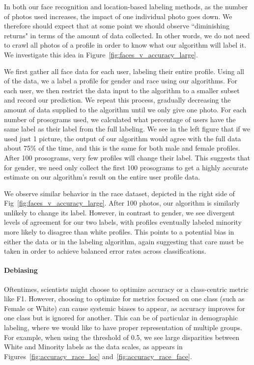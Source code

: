 In both our face recognition and location-based labeling methods, as the number of photos used increases, the impact of one individual photo goes down.
We therefore should expect that at some point we should observe ``diminishing returns" in terms of the amount of data collected.
In other words, we do not need to crawl all photos of a profile in order to know what our algorithm will label it.
We investigate this idea in Figure~\ref{fig:faces_v_accuracy_large}.

We first gather all face data for each user, labeling their entire profile.
Using all of the data, we a label a profile for gender and race using our algorithms.
For each user, we then restrict the data input to the algorithm to a smaller subset and record our prediction.
We repeat this process, gradually decreasing the amount of data supplied to the algorithm until we only give one photo.
For each number of prosograms used, we calculated what percentage of users have the same label as their label from the full labeling.
We see in the left figure that if we used just 1 picture, the output of our algorithm would agree with the full data about 75\% of the time, and this is the same for both male and female profiles.
After 100 prosograms, very few profiles will change their label.
This suggests that for gender, we need only collect the first 100 prosograms to get a highly accurate estimate on our algorithm's result on the entire user profile data.

We observe similar behavior in the race dataset, depicted in the right side of Fig~\ref{fig:faces_v_accuracy_large}.
After 100 photos, our algorithm is similarly unlikely to change its label.
However, in contrast to gender, we see divergent levels of agreement for our two labels, with profiles eventually labeled minority more likely to disagree than white profiles.
This points to a potential bias in either the data or in the labeling algorithm, again suggesting that care must be taken in order to achieve balanced error rates across classifications.

\paragraph{Debiasing}
Oftentimes, scientists might choose to optimize accuracy or a class-centric metric like F1.
However, choosing to optimize for metrics focused on one class (such as Female or White) can cause systemic biases to appear, as accuracy improves for one class but is ignored for another.
This can be of particular in demographic labeling, where we would like to have proper representation of multiple groups.
For example, when using the threshold of 0.5, we see large disparities between White and Minority labels as the data scales, as appears in Figures~\ref{fig:accuracy_race_loc} and~\ref{fig:accuracy_race_face}.


